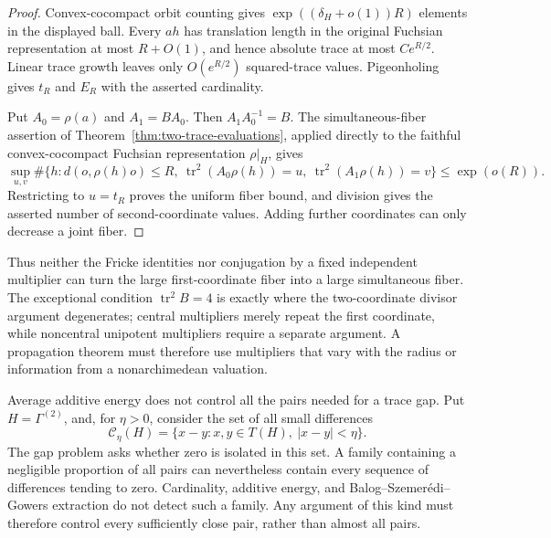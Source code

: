 \documentclass[11pt,reqno]{amsart}
\theoremstyle{definition}
\theoremstyle{remark}
\newcommand{\Tr}{\operatorname{tr}}
\begin{document}
\begin{proof}
Convex-cocompact orbit counting \cite{Roblin} gives
\(\exp((\delta_H+o(1))R)\) elements in the displayed ball.  Every \(ah\)
has translation length in the original Fuchsian representation at most
\(R+O(1)\), and hence absolute trace at most
\(C e^{R/2}\).  Linear trace growth leaves only \(O(e^{R/2})\)
squared-trace values.  Pigeonholing gives \(t_R\) and \(E_R\) with the
asserted cardinality.

Put \(A_0=\rho(a)\) and \(A_1=BA_0\).  Then
\(A_1A_0^{-1}=B\).  The simultaneous-fiber assertion of
Theorem~\ref{thm:two-trace-evaluations}, applied directly to the faithful
convex-cocompact Fuchsian representation \(\rho|_H\), gives
\[
 \sup_{u,v}\#\{h:d(o,\rho(h)o)\le R,
   \ \Tr^2(A_0\rho(h))=u,\ \Tr^2(A_1\rho(h))=v\}
 \le\exp(o(R)).
\]
Restricting to \(u=t_R\) proves the uniform fiber bound, and division gives
the asserted number of second-coordinate values.  Adding further coordinates
can only decrease a joint fiber.
\end{proof}

Thus neither the Fricke identities nor conjugation by a fixed independent
multiplier can turn the large first-coordinate fiber into a large
simultaneous fiber.  The exceptional condition \(\Tr^2B=4\) is
exactly where the two-coordinate divisor argument degenerates; central
multipliers merely repeat the first coordinate, while noncentral unipotent
multipliers require a separate argument.  A propagation theorem must
therefore use multipliers that vary with the radius or information from a
nonarchimedean valuation.

Average additive energy does not control all the pairs needed for a trace gap.
Put \(H=\Gamma^{(2)}\), and, for \(\eta>0\), consider the set of all small
differences
\[
 \mathcal C_\eta(H)=
 \{x-y:x,y\in T(H),\ |x-y|<\eta\}.
\]
The gap problem asks whether zero is isolated in this set.  A family
containing a negligible proportion of all pairs can nevertheless contain
every sequence of differences tending to zero.  Cardinality, additive
energy, and Balog--Szemer\'edi--Gowers extraction do not detect such a
family.  Any argument of this kind must therefore control every
sufficiently close pair, rather than almost all pairs.
\end{document}
